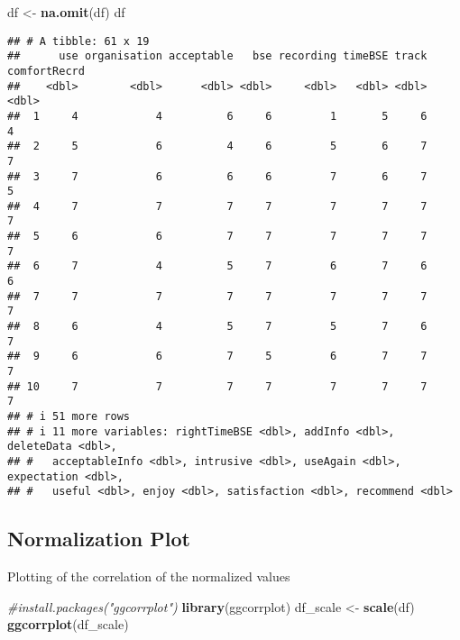 \documentclass[
]{article}
\newenvironment{Shaded}{\begin{snugshade}}{\end{snugshade}}
\newcommand{\CommentTok}[1]{\textcolor[rgb]{0.56,0.35,0.01}{\textit{#1}}}
\newcommand{\FunctionTok}[1]{\textcolor[rgb]{0.13,0.29,0.53}{\textbf{#1}}}
\newcommand{\NormalTok}[1]{#1}
\newcommand{\OtherTok}[1]{\textcolor[rgb]{0.56,0.35,0.01}{#1}}
\begin{document}
\begin{Shaded}
\begin{Highlighting}[]
\NormalTok{df }\OtherTok{\textless{}{-}} \FunctionTok{na.omit}\NormalTok{(df)}
\NormalTok{df}
\end{Highlighting}
\end{Shaded}

\begin{verbatim}
## # A tibble: 61 x 19
##      use organisation acceptable   bse recording timeBSE track comfortRecrd
##    <dbl>        <dbl>      <dbl> <dbl>     <dbl>   <dbl> <dbl>        <dbl>
##  1     4            4          6     6         1       5     6            4
##  2     5            6          4     6         5       6     7            7
##  3     7            6          6     6         7       6     7            5
##  4     7            7          7     7         7       7     7            7
##  5     6            6          7     7         7       7     7            7
##  6     7            4          5     7         6       7     6            6
##  7     7            7          7     7         7       7     7            7
##  8     6            4          5     7         5       7     6            7
##  9     6            6          7     5         6       7     7            7
## 10     7            7          7     7         7       7     7            7
## # i 51 more rows
## # i 11 more variables: rightTimeBSE <dbl>, addInfo <dbl>, deleteData <dbl>,
## #   acceptableInfo <dbl>, intrusive <dbl>, useAgain <dbl>, expectation <dbl>,
## #   useful <dbl>, enjoy <dbl>, satisfaction <dbl>, recommend <dbl>
\end{verbatim}

\hypertarget{normalization-plot}{%
\subsection{Normalization Plot}\label{normalization-plot}}

Plotting of the correlation of the normalized values

\begin{Shaded}
\begin{Highlighting}[]
\CommentTok{\#install.packages("ggcorrplot")}
\FunctionTok{library}\NormalTok{(ggcorrplot)}
\NormalTok{df\_scale }\OtherTok{\textless{}{-}} \FunctionTok{scale}\NormalTok{(df)}
\FunctionTok{ggcorrplot}\NormalTok{(df\_scale)}
\end{Highlighting}
\end{Shaded}
\end{document}
